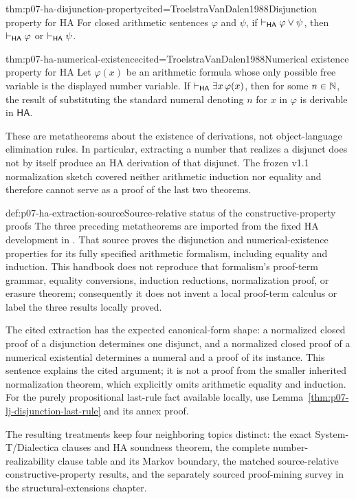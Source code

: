 \begin{hbtheorem}{thm:p07-ha-disjunction-property}{cited=TroelstraVanDalen1988}{Disjunction property for HA}
For closed arithmetic sentences \(\varphi\) and \(\psi\), if
\(\vdash_{\mathsf{HA}}\varphi\lor\psi\), then
\(\vdash_{\mathsf{HA}}\varphi\) or
\(\vdash_{\mathsf{HA}}\psi\).
\end{hbtheorem}

\begin{hbtheorem}{thm:p07-ha-numerical-existence}{cited=TroelstraVanDalen1988}{Numerical existence property for HA}
Let \(\varphi(x)\) be an arithmetic formula whose only possible free variable is
the displayed number variable.  If
\(\vdash_{\mathsf{HA}}\exists x\,\varphi(x)\), then for some \(n\in\mathbb{N}\),
the result of substituting the standard numeral denoting \(n\) for \(x\) in
\(\varphi\) is derivable in \(\mathsf{HA}\).
\end{hbtheorem}

These are metatheorems about the existence of derivations, not
object-language elimination rules.  In particular, extracting a number that
realizes a disjunct does not by itself produce an HA derivation of that
disjunct.  The frozen v1.1 normalization sketch covered neither arithmetic
induction nor equality and therefore cannot serve as a proof of the last two
theorems.

\begin{proofboundary}{def:p07-ha-extraction-source}{Source-relative status of the constructive-property proofs}
The three preceding metatheorems are imported from the fixed HA development in
\textcite[Vol.~I, Chapter~3, \S5.6, beginning at p.~139]{TroelstraVanDalen1988}.
That source proves the disjunction and numerical-existence properties for its
fully specified arithmetic formalism, including equality and induction.  This
handbook does not reproduce that formalism's proof-term grammar, equality
conversions, induction reductions, normalization proof, or erasure theorem;
consequently it does not invent a local proof-term calculus or label the three
results locally proved.

The cited extraction has the expected canonical-form shape: a normalized
closed proof of a disjunction determines one disjunct, and a normalized closed
proof of a numerical existential determines a numeral and a proof of its
instance.  This sentence explains the cited argument; it is not a proof from
the smaller inherited normalization theorem, which explicitly omits arithmetic
equality and induction.  For the purely propositional last-rule fact available
locally, use Lemma~\ref{thm:p07-lj-disjunction-last-rule} and its annex proof.
\end{proofboundary}

The resulting treatments keep four neighboring topics distinct: the exact
System-T/Dialectica clauses and HA soundness theorem, the complete
number-realizability clause table and its Markov boundary, the matched
source-relative constructive-property results, and the separately sourced proof-mining
survey in the structural-extensions chapter.
